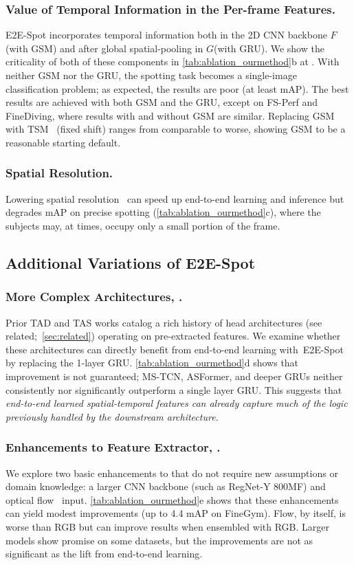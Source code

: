 \documentclass[runningheads]{llncs}
\newcommand{\notation}[1]{\ensuremath{#1}\xspace}
\newcommand{\OURMETHOD}{{E2E-Spot}\xspace}
\newcommand{\fsperf}{{FS-Perf}\xspace}
\newcommand{\finegym}{{FineGym}\xspace}
\newcommand{\finediving}{{FineDiving}\xspace}
\newcommand{\FeatureExtractor}{\notation{F}}
\newcommand{\TemporalArchitecture}{\notation{G}}
\begin{document}
\subsubsection*{Value of Temporal Information in the Per-frame Features.}
\OURMETHOD incorporates temporal information both in the 2D CNN backbone
\FeatureExtractor (with GSM) and after global spatial-pooling in
\TemporalArchitecture (with GRU).
We show the criticality of both of these components in
\autoref{tab:ablation_ourmethod}b at .
With neither GSM nor the GRU, the spotting task becomes a single-image
classification problem; as expected, the results are poor (at least  mAP).
The best results are achieved with both GSM and the GRU, except on \fsperf and \finediving, where results with and without GSM are similar.
Replacing GSM with TSM~\cite{tsm} (fixed shift) ranges from comparable to worse, showing GSM to be a reasonable starting default.


\subsubsection*{Spatial Resolution.}
Lowering spatial resolution~\cite{afsd,e2etad} can speed up end-to-end learning and inference but degrades mAP on precise spotting (\autoref{tab:ablation_ourmethod}c), where the subjects may, at times, occupy only a small portion of the frame.


\subsection{Additional Variations of \OURMETHOD}
\label{sub:variations}

\subsubsection*{More Complex Architectures, .}
Prior TAD and TAS works catalog a rich history of head architectures (see related;~\autoref{sec:related}) operating on pre-extracted features.
We examine whether these architectures can directly benefit from end-to-end learning with~\OURMETHOD by replacing the 1-layer GRU.
\autoref{tab:ablation_ourmethod}d shows that improvement is not guaranteed; MS-TCN, ASFormer, and deeper GRUs neither consistently nor significantly outperform a single layer GRU.
This suggests that \emph{end-to-end learned spatial-temporal features can already capture much of the logic previously handled by the downstream architecture.}

\subsubsection*{Enhancements to Feature Extractor, .}
We explore two basic enhancements to  that do not require new assumptions or domain knowledge: a larger CNN backbone (such as RegNet-Y 800MF) and optical flow~\cite{raft} input.
\autoref{tab:ablation_ourmethod}e shows that these enhancements can yield modest improvements (up to 4.4 mAP on \finegym).
Flow, by itself, is worse than RGB but can improve results when ensembled with RGB.
Larger models show promise on some datasets, but
the improvements are not as significant as the lift from end-to-end learning.
\end{document}
